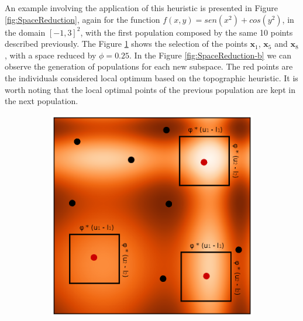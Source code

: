 An example involving the application of this heuristic is presented in Figure \ref{fig:SpaceReduction}, again for the function $f(x, y) = sen(x^2) + cos(y^2)$, in the domain $[-1, 3]^2$, with the first population composed by the same 10 points described previously. The Figure \ref{fig:SpaceReduction-a} shows the selection of the points $\bm{x}_1$, $\bm{x}_5$ and $\bm{x}_8$, with a space reduced by $\phi = 0.25$. In the Figure \ref{fig:SpaceReduction-b} we can observe the generation of populations for each new subspace. The red points are the individuals considered local optimum based on the topographic heuristic. It is worth noting that the local optimal points of the previous population are kept in the next population.


\begin{figure}[tp]
\centering
\begin{subfigure}{.5\textwidth}
  \centering
  \includegraphics[width=1.1\linewidth]{fig_2.eps}
  \caption{}
  \label{fig:SpaceReduction-a}
\end{subfigure}%
\begin{subfigure}{.5\textwidth}
  \centering

\end{subfigure}
\end{figure}
